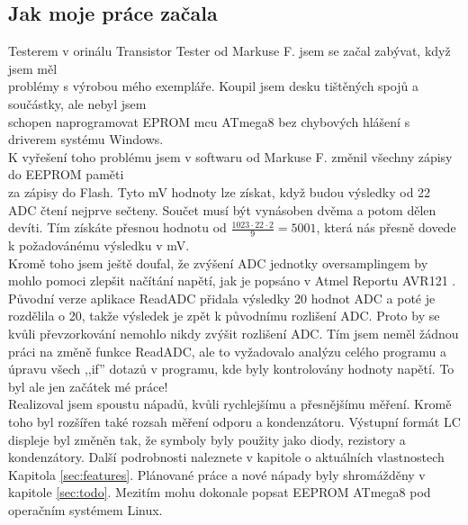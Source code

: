 \subsection*{Jak moje práce začala}
Testerem v orinálu Transistor Tester od Markuse F. \cite{Frejek} jsem se začal zabývat, když jsem měl
\\problémy s výrobou mého exempláře. Koupil jsem desku tištěných spojů a součástky, ale nebyl jsem
\\schopen naprogramovat EPROM mcu ATmega8 bez chybových hlášení s driverem systému Windows.
\\K vyřešení toho problému jsem v softwaru od Markuse F. změnil všechny zápisy do EEPROM paměti
\\za zápisy do Flash.
Tyto mV hodnoty lze získat, když budou výsledky od 22 ADC čtení nejprve sečteny.
Součet musí být vynásoben dvěma a potom dělen devíti.
Tím získáte přesnou hodnotu od \begin{math}\frac{1023\cdot22\cdot2}{9} = 5001\end{math},
která nás přesně dovede k požadovánému výsledku v mV.\\
Kromě toho jsem ještě doufal, že zvýšení ADC jednotky oversamplingem by mohlo
pomoci zlepšit načítání napětí, jak je popsáno v Atmel Reportu AVR121 \cite{AVR121}.
Původní verze aplikace ReadADC přidala výsledky 20 hodnot ADC a poté je rozdělila o 20,
takže výsledek je zpět k původnímu rozlišení ADC. Proto by se kvůli převzorkování
nemohlo nikdy zvýšit rozlišení ADC.
Tím jsem neměl žádnou práci na změně funkce ReadADC, ale to vyžadovalo analýzu celého programu
a úpravu všech ,,if'' dotazů v programu, kde byly kontrolovány hodnoty napětí.
To byl ale jen začátek mé práce!\\
Realizoval jsem spoustu nápadů, kvůli rychlejšímu a přesnějšímu měření.
Kromě toho byl rozšířen také rozsah měření odporu a kondenzátoru.
Výstupní formát LC displeje byl změněn tak, že symboly byly použity jako diody, rezistory a kondenzátory.
Další podrobnosti naleznete v kapitole o aktuálních vlastnostech Kapitola \ref{sec:features}. 
Plánované práce a nové nápady byly shromážděny v kapitole \ref{sec:todo}.
Mezitím mohu dokonale popsat EEPROM ATmega8 pod operačním systémem Linux.

